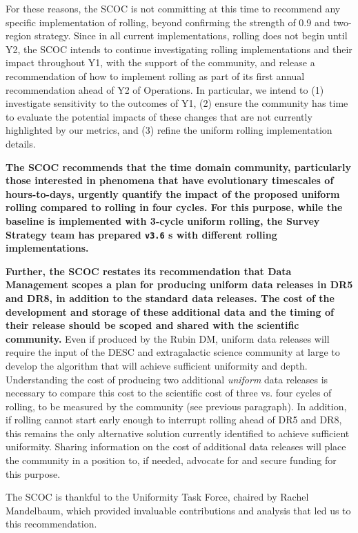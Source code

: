 For these reasons, the SCOC is not committing at this time to recommend any specific implementation of rolling, beyond confirming the strength of 0.9 and two-region strategy. Since in all current implementations,
rolling does not begin until Y2, the SCOC intends to continue investigating rolling implementations and their impact throughout Y1, with the support of the community, and release a recommendation of how to implement rolling as part of its first annual recommendation ahead of Y2 of Operations. In particular, we intend to (1) investigate sensitivity to the outcomes of Y1, (2) ensure the community has time to evaluate the potential impacts of these changes that are not currently highlighted by our metrics, and (3) refine the uniform rolling implementation details.

{\bf The SCOC recommends that the time domain community, particularly those interested in phenomena that have evolutionary timescales of hours-to-days, urgently quantify the impact of the proposed uniform rolling compared to rolling in four cycles. For this purpose, while the baseline is implemented with 3-cycle uniform rolling, the Survey Strategy team has prepared \texttt{v3.6} \opsim s  with different rolling implementations.}

{\bf Further, the SCOC restates its recommendation that Data Management scopes a plan for producing uniform data releases in DR5 and DR8, in addition to the standard data releases. The cost of the development and storage of these additional data and the timing of their release should be scoped and shared with the scientific community.} Even if produced by the Rubin DM, uniform data releases will require the input of the DESC and extragalactic science community at large to develop the algorithm that will achieve sufficient uniformity and depth. Understanding the cost of producing two additional {\it uniform} data releases is necessary to compare this cost to the scientific cost of three vs. four cycles of rolling, to be measured by the community (see previous paragraph). In addition, if rolling cannot start early enough to interrupt rolling ahead of DR5 and DR8, this remains the only alternative solution currently identified to achieve sufficient uniformity. Sharing information on the cost of additional data releases will place the community in a position to, if needed, advocate for and secure funding for this purpose.

The SCOC is thankful to the Uniformity Task Force, chaired by Rachel Mandelbaum, which provided invaluable contributions and analysis that led us to this recommendation.

